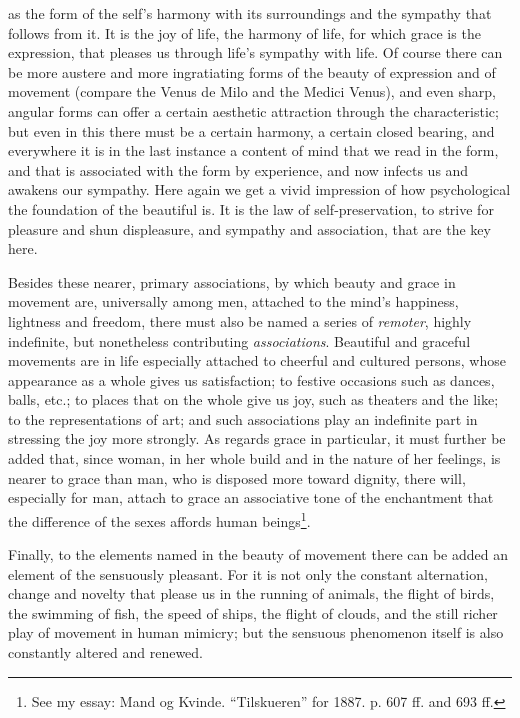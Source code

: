 \documentclass[12pt,a4paper,openany]{book}
\newcommand{\opage}[1]{\marginnote{\footnotesize\textit{[#1]}}}
\begin{document}
as the form of the self's harmony with its surroundings and the sympathy
that follows from it. It is the joy of life, the harmony of life, for
which grace is the expression, that pleases us through life's
sympathy with life. Of course there can be more austere and
\setcounter{footnote}{0}%
\opage{274}more ingratiating forms of the beauty of expression and of
movement (compare the Venus de Milo and the Medici Venus),
and even sharp, angular forms can offer a certain aesthetic attraction
through the characteristic; but even in this there must
be a certain harmony, a certain closed bearing, and everywhere
it is in the last instance a content of mind that we read in the form, and
that is associated with the form by experience, and now infects
us and awakens our sympathy. Here again we get a vivid impression
of how psychological the foundation of the beautiful is. It is
the law of self-preservation, to strive for pleasure and shun displeasure,
and sympathy and association, that are the key here.

Besides these nearer, primary associations, by
which beauty and grace in movement are, universally among men,
attached to the mind's happiness, lightness and freedom, there must also be named
a series of \emph{remoter}, highly indefinite, but nonetheless contributing
\emph{associations}. Beautiful and graceful movements
are in life especially attached to cheerful and cultured persons,
whose appearance as a whole gives us satisfaction; to
festive occasions such as dances, balls, etc.; to places that on the
whole give us joy, such as theaters and the like; to the representations
of art; and such associations play an indefinite
part in stressing the joy more strongly. As regards grace in particular,
it must further be added that, since woman, in her whole
build and in the nature of her feelings, is nearer to
grace than man, who is disposed more toward dignity,
there will, especially for man, attach to grace an associative tone
of the enchantment that the difference of the sexes affords human beings\footnote[1]{See my essay: Mand og Kvinde. ``Tilskueren'' for 1887. p. 607 ff. and 693 ff.}.

Finally, to the elements named in the beauty of movement
there can be added an element of the sensuously pleasant.
For it is not only the constant alternation, change and
novelty that please us in the running of animals, the flight of birds,
the swimming of fish, the speed of ships, the flight of clouds, and the
\setcounter{footnote}{0}%
\opage{275}still richer play of movement in human mimicry; but
the sensuous phenomenon itself is also constantly altered and renewed.
\end{document}
